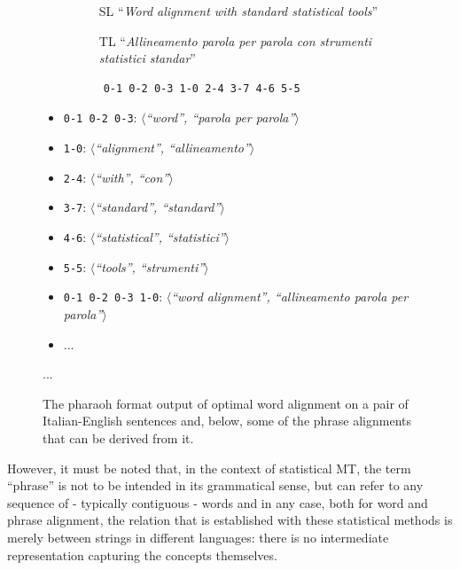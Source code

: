 \begin{figure}[h]
    \centering
    \begin{subfigure}{.55\textwidth}
      \centering
      \footnotesize
      \begin{itemize}
          \item[SL] ``\textit{Word alignment with standard statistical tools}''
          \item[TL] ``\textit{Allineamento parola per parola con strumenti statistici standar}''
      \end{itemize}
    \end{subfigure}%
    \begin{subfigure}{.45\textwidth}
        \centering
        \footnotesize
        \setlength{\unitlength}{0.21mm}
        \begin{verbatim}
    0-1 0-2 0-3 1-0 2-4 3-7 4-6 5-5
        \end{verbatim}
    \end{subfigure}
    \footnotesize
    \smallskip
    \smallskip
    \begin{itemize}
        \item \texttt{0-1 0-2 0-3}: $\langle$\textit{``word'', ``parola per parola''}$\rangle$
        \item \texttt{1-0}: $\langle$\textit{``alignment'', ``allineamento''}$\rangle$
        \item \texttt{2-4}: $\langle$\textit{``with'', ``con''}$\rangle$
        \item \texttt{3-7}: $\langle$\textit{``standard'', ``standard''}$\rangle$
        \item \texttt{4-6}: $\langle$\textit{``statistical'', ``statistici''}$\rangle$
        \item \texttt{5-5}: $\langle$\textit{``tools'', ``strumenti''}$\rangle$
        \item \texttt{0-1 0-2 0-3 1-0}: $\langle$\textit{``word alignment'', ``allineamento parola per parola''}$\rangle$
        \item ...
    \end{itemize}
    ...
    \caption[The pharaoh format output of optimal word alignment on a pair of Italian-English sentences and some derived phrase alignments]{The pharaoh format output of optimal word alignment on a pair of Italian-English sentences and, below, some of the phrase alignments that can be derived from it.}
    \label{wordalgn}
\end{figure}

However, it must be noted that, in the context of statistical MT, the term ``phrase'' is not to be intended in its grammatical sense, but can refer to any sequence of - typically contiguous - words and in any case, both for word and phrase alignment, the relation that is established with these statistical methods is merely between strings in different languages: there is no intermediate representation capturing the concepts themselves. \smallskip

